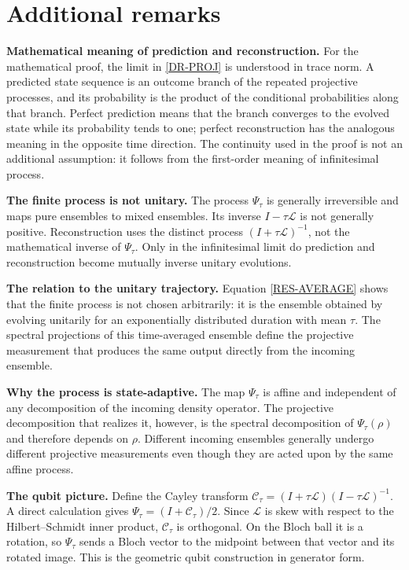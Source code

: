 \documentclass{techbrief}
\begin{document}
\section{Additional remarks}

\textbf{Mathematical meaning of prediction and reconstruction.} For the mathematical proof, the limit in \ref{DR-PROJ} is understood in trace norm. A predicted state sequence is an outcome branch of the repeated projective processes, and its probability is the product of the conditional probabilities along that branch. Perfect prediction means that the branch converges to the evolved state while its probability tends to one; perfect reconstruction has the analogous meaning in the opposite time direction. The continuity used in the proof is not an additional assumption: it follows from the first-order meaning of infinitesimal process.

\textbf{The finite process is not unitary.} The process $\Psi_\tau$ is generally irreversible and maps pure ensembles to mixed ensembles. Its inverse $I-\tau\mathcal{L}$ is not generally positive. Reconstruction uses the distinct process $(I+\tau\mathcal{L})^{-1}$, not the mathematical inverse of $\Psi_\tau$. Only in the infinitesimal limit do prediction and reconstruction become mutually inverse unitary evolutions.

\textbf{The relation to the unitary trajectory.} Equation \ref{RES-AVERAGE} shows that the finite process is not chosen arbitrarily: it is the ensemble obtained by evolving unitarily for an exponentially distributed duration with mean $\tau$. The spectral projections of this time-averaged ensemble define the projective measurement that produces the same output directly from the incoming ensemble.

\textbf{Why the process is state-adaptive.} The map $\Psi_\tau$ is affine and independent of any decomposition of the incoming density operator. The projective decomposition that realizes it, however, is the spectral decomposition of $\Psi_\tau(\rho)$ and therefore depends on $\rho$. Different incoming ensembles generally undergo different projective measurements even though they are acted upon by the same affine process. 

\textbf{The qubit picture.} Define the Cayley transform $\mathcal{C}_\tau=(I+\tau\mathcal{L})(I-\tau\mathcal{L})^{-1}$. A direct calculation gives $\Psi_\tau=(I+\mathcal{C}_\tau)/2$. Since $\mathcal{L}$ is skew with respect to the Hilbert--Schmidt inner product, $\mathcal{C}_\tau$ is orthogonal. On the Bloch ball it is a rotation, so $\Psi_\tau$ sends a Bloch vector to the midpoint between that vector and its rotated image. This is the geometric qubit construction in generator form.
\end{document}

